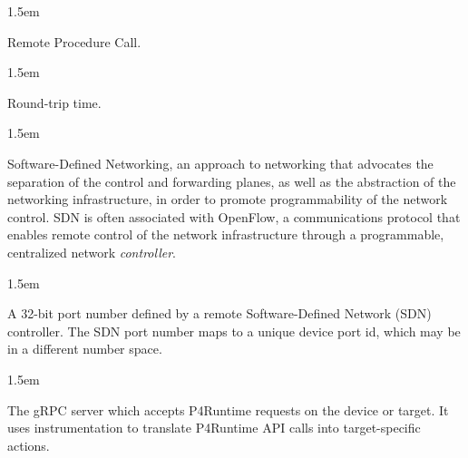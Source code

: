 \documentclass[11pt]{article}
\begin{document}
{\begin{mddefinitions}

\begin{mdbmarginx}{}{}{}{1.5em}%
\begin{mddefdata}%
Remote Procedure Call.
\end{mddefdata}%
\end{mdbmarginx}%


\begin{mdbmarginx}{}{}{}{1.5em}%
\begin{mddefdata}%
Round-trip time.
\end{mddefdata}%
\end{mdbmarginx}%


\begin{mdbmarginx}{}{}{}{1.5em}%
\begin{mddefdata}%
Software-Defined Networking, an approach to networking that advocates the
separation of the control and forwarding planes, as well as the abstraction
of the networking infrastructure, in order to promote programmability of the
network control. SDN is often associated with OpenFlow, a communications
protocol that enables remote control of the network infrastructure through a
programmable, centralized network \emph{controller}.
\end{mddefdata}%
\end{mdbmarginx}%


\begin{mdbmarginx}{}{}{}{1.5em}%
\begin{mddefdata}%
A 32-bit port number defined by a remote Software-Defined Network (SDN)
controller. The SDN port number maps to a unique device port id, which may
be in a different number space.
\end{mddefdata}%
\end{mdbmarginx}%


\begin{mdbmarginx}{}{}{}{1.5em}%
\begin{mddefdata}%
The gRPC server which accepts P4Runtime requests on the device or target. It
uses instrumentation to translate P4Runtime API calls into target-specific
actions.
\end{mddefdata}%
\end{mdbmarginx}%


\end{mddefinitions}}
\end{document}
